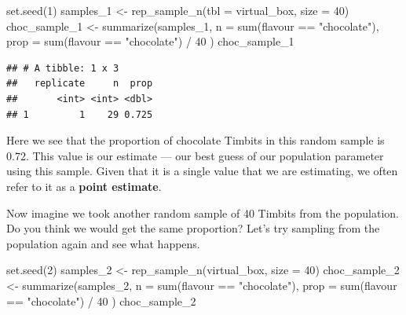 \documentclass[
]{krantz}
\makeatletter
\newenvironment{Shaded}{\begin{snugshade}}{\end{snugshade}}
\newcommand{\AttributeTok}[1]{\textcolor[rgb]{0.61,0.61,0.61}{#1}}
\newcommand{\DecValTok}[1]{\textcolor[rgb]{0.06,0.06,0.06}{#1}}
\newcommand{\FunctionTok}[1]{\textcolor[rgb]{0,0,0}{#1}}
\newcommand{\NormalTok}[1]{#1}
\newcommand{\OtherTok}[1]{\textcolor[rgb]{0.37,0.37,0.37}{#1}}
\newcommand{\SpecialCharTok}[1]{\textcolor[rgb]{0,0,0}{#1}}
\newcommand{\StringTok}[1]{\textcolor[rgb]{0.5,0.5,0.5}{#1}}
\newenvironment{kframe}{%
\medskip{}
\setlength{\fboxsep}{.8em}
 \def\at@end@of@kframe{}%
 \ifinner\ifhmode%
  \def\at@end@of@kframe{\end{minipage}}%
  \begin{minipage}{\columnwidth}%
 \fi\fi%
 \def\FrameCommand##1{\hskip\@totalleftmargin \hskip-\fboxsep
 \colorbox{shadecolor}{##1}\hskip-\fboxsep
     \hskip-\linewidth \hskip-\@totalleftmargin \hskip\columnwidth}%
 \MakeFramed {\advance\hsize-\width
   \@totalleftmargin\z@ \linewidth\hsize
   \@setminipage}}%
 {\par\unskip\endMakeFramed%
 \at@end@of@kframe}
\renewenvironment{Shaded}{\begin{kframe}}{\end{kframe}}
\makeatother
\begin{document}
\begin{Shaded}
\begin{Highlighting}[]
\FunctionTok{set.seed}\NormalTok{(}\DecValTok{1}\NormalTok{)}
\NormalTok{samples\_1 }\OtherTok{\textless{}{-}} \FunctionTok{rep\_sample\_n}\NormalTok{(}\AttributeTok{tbl =}\NormalTok{ virtual\_box, }\AttributeTok{size =} \DecValTok{40}\NormalTok{)}
\NormalTok{choc\_sample\_1 }\OtherTok{\textless{}{-}} \FunctionTok{summarize}\NormalTok{(samples\_1,}
  \AttributeTok{n =} \FunctionTok{sum}\NormalTok{(flavour }\SpecialCharTok{==} \StringTok{"chocolate"}\NormalTok{),}
  \AttributeTok{prop =} \FunctionTok{sum}\NormalTok{(flavour }\SpecialCharTok{==} \StringTok{"chocolate"}\NormalTok{) }\SpecialCharTok{/} \DecValTok{40}
\NormalTok{)}
\NormalTok{choc\_sample\_1}
\end{Highlighting}
\end{Shaded}

\begin{verbatim}
## # A tibble: 1 x 3
##   replicate     n  prop
##       <int> <int> <dbl>
## 1         1    29 0.725
\end{verbatim}

Here we see that the proportion of chocolate Timbits in this random sample is
0.72. This value is our estimate --- our best guess of our population parameter using this sample. Given that it is a single
value that we are estimating, we often refer to it as a \textbf{point estimate}.

Now imagine we took another random sample of 40 Timbits from the population. Do you
think we would get the same proportion? Let's try sampling from the population
again and see what happens.

\begin{Shaded}
\begin{Highlighting}[]
\FunctionTok{set.seed}\NormalTok{(}\DecValTok{2}\NormalTok{)}
\NormalTok{samples\_2 }\OtherTok{\textless{}{-}} \FunctionTok{rep\_sample\_n}\NormalTok{(virtual\_box, }\AttributeTok{size =} \DecValTok{40}\NormalTok{)}
\NormalTok{choc\_sample\_2 }\OtherTok{\textless{}{-}} \FunctionTok{summarize}\NormalTok{(samples\_2,}
  \AttributeTok{n =} \FunctionTok{sum}\NormalTok{(flavour }\SpecialCharTok{==} \StringTok{"chocolate"}\NormalTok{),}
  \AttributeTok{prop =} \FunctionTok{sum}\NormalTok{(flavour }\SpecialCharTok{==} \StringTok{"chocolate"}\NormalTok{) }\SpecialCharTok{/} \DecValTok{40}
\NormalTok{)}
\NormalTok{choc\_sample\_2}
\end{Highlighting}
\end{Shaded}
\end{document}
